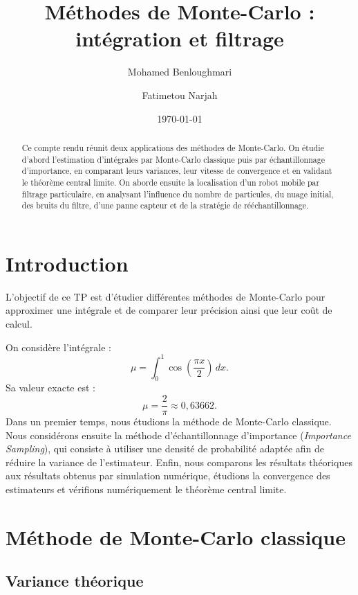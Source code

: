 \documentclass[11pt]{article}
\title{\bfseries Méthodes de Monte-Carlo : intégration et filtrage}
\author{Mohamed Benloughmari \and Fatimetou Narjah}
\date{\today}
\theoremstyle{definition}
\theoremstyle{remark}
\begin{document}
\maketitle

\begin{abstract}
Ce compte rendu réunit deux applications des méthodes de Monte-Carlo. On étudie
d'abord l'estimation d'intégrales par Monte-Carlo classique puis par
échantillonnage d'importance, en comparant leurs variances, leur vitesse de
convergence et en validant le théorème central limite. On aborde ensuite la
localisation d'un robot mobile par filtrage particulaire, en analysant
l'influence du nombre de particules, du nuage initial, des bruits du filtre,
d'une panne capteur et de la stratégie de rééchantillonnage.
\end{abstract}


\section{Introduction}

L'objectif de ce TP est d'étudier différentes méthodes de Monte-Carlo pour
approximer une intégrale et de comparer leur précision ainsi que leur coût de
calcul.

On considère l'intégrale :
\[
\mu = \int_0^1 \cos\left(\frac{\pi x}{2}\right)\,dx.
\]
Sa valeur exacte est :
\[
\mu = \frac{2}{\pi} \approx 0{,}63662.
\]
Dans un premier temps, nous étudions la méthode de Monte-Carlo classique. Nous
considérons ensuite la méthode d'échantillonnage d'importance
(\textit{Importance Sampling}), qui consiste à utiliser une densité de
probabilité adaptée afin de réduire la variance de l'estimateur. Enfin, nous
comparons les résultats théoriques aux résultats obtenus par simulation
numérique, étudions la convergence des estimateurs et vérifions numériquement
le théorème central limite.

\section{Méthode de Monte-Carlo classique}

\subsection{Variance théorique}
\end{document}
